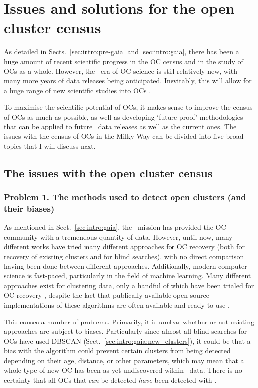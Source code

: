 \section{Issues and solutions for the open cluster census}
\label{sec:intro:aims}

As detailed in Sects.~\ref{sec:intro:pre-gaia} and \ref{sec:intro:gaia}, there has been a huge amount of recent scientific progress in the OC census and in the study of OCs as a whole. However, the \gaia\ era of OC science is still relatively new, with many more years of data releases being anticipated. Inevitably, this will allow for a huge range of new scientific studies into OCs \citep{gaia_collaboration_gaia_2022}. 

To maximise the scientific potential of OCs, it makes sense to improve the census of OCs as much as possible, as well as developing `future-proof' methodologies that can be applied to future \gaia\ data releases as well as the current ones. The issues with the census of OCs in the Milky Way can be divided into five broad topics that I will discuss next.


\subsection{The issues with the open cluster census}
\label{sec:intro:aims:issues}
\subsubsection{Problem 1. The methods used to detect open clusters (and their biases)}
\label{sec:intro:aims:issues:detection}

As mentioned in Sect.~\ref{sec:intro:gaia}, the \gaia\ mission has provided the OC community with a tremendous quantity of data. However, until now, many different works have tried many different approaches for OC recovery (both for recovery of existing clusters and for blind searches), with no direct comparison having been done between different approaches. Additionally, modern computer science is fast-paced, particularly in the field of machine learning. Many different approaches exist for clustering data, only a handful of which have been trialed for OC recovery \citep{xu_comprehensive_2015}, despite the fact that publically available open-source implementations of these algorithms are often available and ready to use \citep[e.g.][]{scikit-learn}.

This causes a number of problems. Primarily, it is unclear whether or not existing approaches are subject to biases. Particularly since almost all blind searches for OCs have used DBSCAN (Sect.~\ref{sec:intro:gaia:new_clusters}), it could be that a bias with the algorithm could prevent certain clusters from being detected depending on their age, distance, or other parameters, which may mean that a whole type of new OC has been as-yet undiscovered within \gaia\ data. There is no certainty that all OCs that \emph{can} be detected \emph{have} been detected with \gaia.

